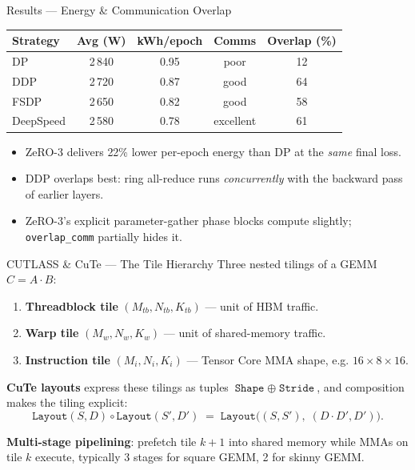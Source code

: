 \documentclass[10pt,aspectratio=169]{beamer}
\begin{document}
\begin{frame}{Results — Energy \& Communication Overlap}
  \footnotesize
  \begin{tabular}{@{}lcccc@{}}
    \toprule
    \textbf{Strategy} & \textbf{Avg (W)} & \textbf{kWh/epoch}
                      & \textbf{Comms} & \textbf{Overlap (\%)}\\
    \midrule
    DP              & 2\,840 & 0.95 & poor       & 12\\
    DDP             & 2\,720 & 0.87 & good       & 64\\
    FSDP            & 2\,650 & 0.82 & good       & 58\\
    DeepSpeed       & 2\,580 & 0.78 & \alert{excellent} & 61\\
    \bottomrule
  \end{tabular}
  \vspace{2ex}

  \begin{itemize}
    \item ZeRO-3 delivers \alert{22\%} lower per-epoch energy than DP
          at the \emph{same} final loss.
    \item DDP overlaps best: ring all-reduce runs \emph{concurrently}
          with the backward pass of earlier layers.
    \item ZeRO-3's explicit parameter-gather phase blocks compute
          slightly; \texttt{overlap\_comm} partially hides it.
  \end{itemize}
\end{frame}


\begin{frame}{CUTLASS \& CuTe — The Tile Hierarchy}
  Three nested tilings of a GEMM $C = A\cdot B$:
  \begin{enumerate}
    \item \textbf{Threadblock tile} $(M_{tb}, N_{tb}, K_{tb})$
          — unit of HBM traffic.
    \item \textbf{Warp tile}       $(M_w, N_w, K_w)$
          — unit of shared-memory traffic.
    \item \textbf{Instruction tile} $(M_i, N_i, K_i)$
          — Tensor Core MMA shape, e.g. $16{\times}8{\times}16$.
  \end{enumerate}
  \vspace{1ex}
  \textbf{CuTe layouts} express these tilings as tuples
  $\texttt{Shape}\;\oplus\;\texttt{Stride}$, and composition makes the
  tiling explicit:
  \[
    \texttt{Layout}(S,D) \circ \texttt{Layout}(S', D')
      \;=\; \texttt{Layout}\bigl((S, S'),\; (D\cdot D', D')\bigr).
  \]
  \vspace{-1ex}

  \textbf{Multi-stage pipelining}: prefetch tile $k{+}1$ into shared
  memory while MMAs on tile $k$ execute, typically 3 stages for
  square GEMM, 2 for skinny GEMM.
\end{frame}
\end{document}
